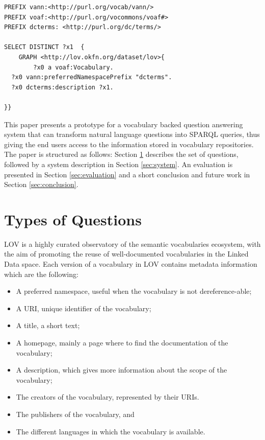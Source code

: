 \documentclass{acm}
\begin{document}
\begin{verbatim}
PREFIX vann:<http://purl.org/vocab/vann/>
PREFIX voaf:<http://purl.org/vocommons/voaf#>
PREFIX dcterms: <http://purl.org/dc/terms/>

SELECT DISTINCT ?x1  {
 	GRAPH <http://lov.okfn.org/dataset/lov>{
 	 	?x0 a voaf:Vocabulary.
  ?x0 vann:preferredNamespacePrefix "dcterms".
  ?x0 dcterms:description ?x1.
 	 
}}
\end{verbatim}


This paper presents a prototype for a vocabulary backed question answering system that can transform natural language questions into SPARQL queries, thus giving the end users access to the information stored in vocabulary repositories. The paper is structured as follows: Section \ref{sec:questions} describes the set of questions, followed by a system description in Section \ref{sec:system}. An evaluation is presented in Section \ref{sec:evaluation} and a short conclusion and future work in Section \ref{sec:conclusion}.  



\section{Types of Questions}
\label{sec:questions}

LOV is a highly curated observatory of the semantic vocabularies ecosystem, with the aim of promoting the reuse of well-documented vocabularies in the Linked Data space. Each version of a vocabulary in LOV contains metadata information which are the following:
\begin{itemize}
\item A preferred namespace, useful when the vocabulary is not dereference-able; 
\item A URI, unique identifier of the vocabulary;
\item A title, a short text; 
\item A homepage, mainly a page where to find the documentation of the vocabulary;
\item A description, which gives more information about the scope of the vocabulary;
\item The creators of the vocabulary, represented by their URIs.
\item The publishers of the vocabulary, and
\item The different languages in which the vocabulary is available.
\end{itemize}
\end{document}

